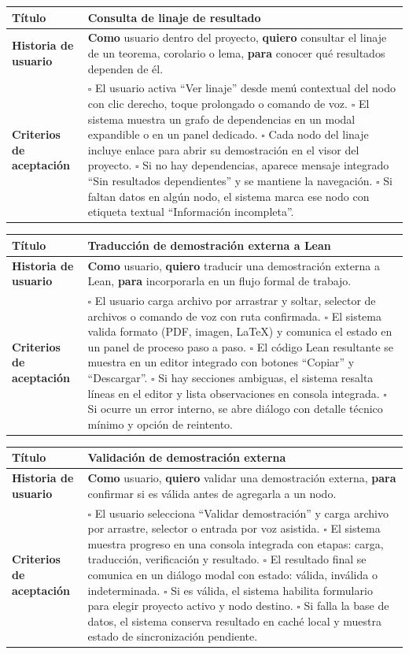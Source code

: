 \documentclass{article}
\newcommand{\story}[3]{
\begin{table}[H]
    \centering
    \begin{tabularx}{\textwidth}{| >{\raggedright\arraybackslash\bfseries\columncolor{leftheaderbg}}p{2.5cm} | >{\raggedright\arraybackslash\columncolor{contentbg}}X |}
        \hline
        Título & #1 \\
        \hline
        Historia de usuario & #2 \\
        \hline
        Criterios de aceptación & #3 \\
        \hline
    \end{tabularx}
\end{table}
}
\begin{document}
\story
{Consulta de linaje de resultado}
{\textbf{Como} usuario dentro del proyecto, \textbf{quiero} consultar el linaje de un teorema, corolario o lema, \textbf{para} conocer qué resultados dependen de él.}
{$\square$ El usuario activa ``Ver linaje'' desde menú contextual del nodo con clic derecho, toque prolongado o comando de voz. \newline
$\square$ El sistema muestra un grafo de dependencias en un modal expandible o en un panel dedicado. \newline
$\square$ Cada nodo del linaje incluye enlace para abrir su demostración en el visor del proyecto. \newline
$\square$ Si no hay dependencias, aparece mensaje integrado ``Sin resultados dependientes'' y se mantiene la navegación. \newline
$\square$ Si faltan datos en algún nodo, el sistema marca ese nodo con etiqueta textual ``Información incompleta''.}

\story
{Traducción de demostración externa a Lean}
{\textbf{Como} usuario, \textbf{quiero} traducir una demostración externa a Lean, \textbf{para} incorporarla en un flujo formal de trabajo.}
{$\square$ El usuario carga archivo por arrastrar y soltar, selector de archivos o comando de voz con ruta confirmada. \newline
$\square$ El sistema valida formato (PDF, imagen, LaTeX) y comunica el estado en un panel de proceso paso a paso. \newline
$\square$ El código Lean resultante se muestra en un editor integrado con botones ``Copiar'' y ``Descargar''. \newline
$\square$ Si hay secciones ambiguas, el sistema resalta líneas en el editor y lista observaciones en consola integrada. \newline
$\square$ Si ocurre un error interno, se abre diálogo con detalle técnico mínimo y opción de reintento.}

\story
{Validación de demostración externa}
{\textbf{Como} usuario, \textbf{quiero} validar una demostración externa, \textbf{para} confirmar si es válida antes de agregarla a un nodo.}
{$\square$ El usuario selecciona ``Validar demostración'' y carga archivo por arrastre, selector o entrada por voz asistida. \newline
$\square$ El sistema muestra progreso en una consola integrada con etapas: carga, traducción, verificación y resultado. \newline
$\square$ El resultado final se comunica en un diálogo modal con estado: válida, inválida o indeterminada. \newline
$\square$ Si es válida, el sistema habilita formulario para elegir proyecto activo y nodo destino. \newline
$\square$ Si falla la base de datos, el sistema conserva resultado en caché local y muestra estado de sincronización pendiente.}
\end{document}
